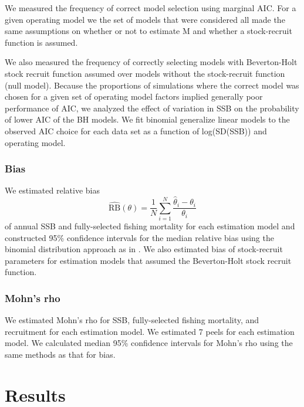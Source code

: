\documentclass[
  12pt,
]{article}
\begin{document}
We measured the frequency of correct model selection using marginal AIC.
For a given operating model we the set of models that were considered
all made the same assumptions on whether or not to estimate M and
whether a stock-recruit function is assumed.

We also measured the frequency of correctly selecting models with
Beverton-Holt stock recruit function assumed over models without the
stock-recruit function (null model). Because the proportions of
simulations where the correct model was chosen for a given set of
operating model factors implied generally poor performance of AIC, we
analyzed the effect of variation in SSB on the probability of lower AIC
of the BH models. We fit binomial generalize linear models to the
observed AIC choice for each data set as a function of log(SD(SSB)) and
operating model.

\hypertarget{bias}{%
\subsubsection*{Bias}\label{bias}}

We estimated relative bias \[
\widehat {\text{RB}}\left(\theta\right) = \frac{1}{N} \sum^N_{i = 1} \frac{\widehat \theta_i - \theta_i}{\theta_i}
\] of annual SSB and fully-selected fishing mortality for each
estimation model and constructed 95\% confidence intervals for the
median relative bias using the binomial distribution approach as in
\citet{stockmiller21}. We also estimated bias of stock-recruit
parameters for estimation models that assumed the Beverton-Holt stock
recruit function.

\hypertarget{mohns-rho}{%
\subsubsection*{Mohn's rho}\label{mohns-rho}}

We estimated Mohn's rho for SSB, fully-selected fishing mortality, and
recruitment for each estimation model. We estimated 7 peels for each
estimation model. We calculated median 95\% confidence intervals for
Mohn's rho using the same methods as that for bias.

\hypertarget{results}{%
\section*{Results}\label{results}}
\end{document}
